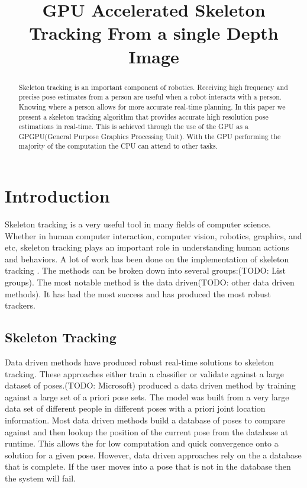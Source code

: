 \documentclass[conference]{IEEEtran}
\begin{document}
\title{GPU Accelerated Skeleton Tracking From a single Depth Image}

\author{
}

\maketitle

\begin{abstract}
Skeleton tracking is an important component of robotics. Receiving high frequency and precise pose estimates from a person are useful when a robot interacts with a person. Knowing where a person allows for more accurate real-time planning. In this paper we present a skeleton tracking algorithm that provides accurate high resolution pose estimations in real-time. This is achieved through the use of the GPU as a GPGPU(General Purpose Graphics Processing Unit). With the GPU performing the majority of the computation the CPU can attend to other tasks.
\end{abstract}

\IEEEpeerreviewmaketitle

\section{Introduction}
\label{sec:intro}
Skeleton tracking is a very useful tool in many fields of computer science. Whether in human computer interaction, computer vision, robotics, graphics, and etc, skeleton tracking plays an important role in understanding human actions and behaviors. A lot of work has been done on the implementation of skeleton tracking \cite{Ganapathi2010,Bleiweiss2009,Baak2011,Plagemann2010,Knoop2009}. The methods can be broken down into several groups:(TODO: List groups). The most notable method is the data driven\cite{Baak2011,export:145347}(TODO: other data driven methods). It has had the most success and has produced the most robust trackers.

\subsection{Skeleton Tracking}
\label{subsec:skel}
Data driven methods have produced robust real-time solutions to skeleton tracking\cite{Baak2011}. These approaches either train a classifier or validate against a large dataset of poses.(TODO: Microsoft) produced a data driven method by training against a large set of a priori pose sets. The model was built from a very large data set of different people in different poses with a priori joint location information. Most data driven methods build a database of poses to compare against and then lookup the position of the current pose from the database at runtime. This allows the for low computation and quick convergence onto a solution for a given pose. However, data driven approaches rely on the a database that is complete. If the user moves into a pose that is not in the database then the system will fail.
\end{document}
